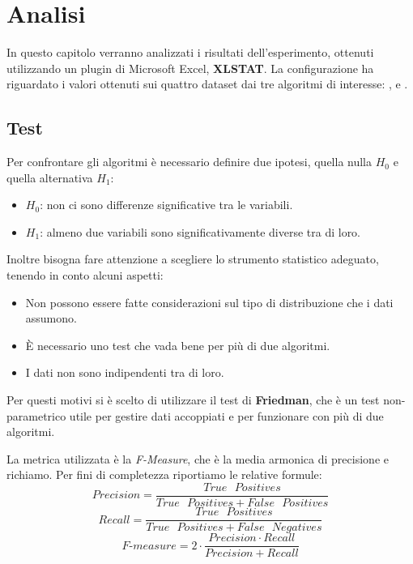 \chapter{Analisi}

In questo capitolo verranno analizzati i risultati dell'esperimento, ottenuti utilizzando un plugin di Microsoft Excel, \textbf{XLSTAT}. La configurazione ha riguardato i valori ottenuti sui quattro dataset dai tre algoritmi di interesse: ,  e .

\section{Test}

Per confrontare gli algoritmi è necessario definire due ipotesi, quella nulla $H_0$ e quella alternativa $H_1$:

\begin{itemize}
	\item $H_0$: non ci sono differenze significative tra le variabili.
	\item $H_1$: almeno due variabili sono significativamente diverse tra di loro.
\end{itemize}

\noindent
Inoltre bisogna fare attenzione a scegliere lo strumento statistico adeguato, tenendo in conto alcuni aspetti:
\begin{itemize}
	\item Non possono essere fatte considerazioni sul tipo di distribuzione che i dati assumono.
	\item È necessario uno test che vada bene per più di due algoritmi.
	\item I dati non sono indipendenti tra di loro.
\end{itemize}

Per questi motivi si è scelto di utilizzare il test di \textbf{Friedman}, che è un test non-parametrico utile per gestire dati accoppiati e per funzionare con più di due algoritmi\cite{Demsar:2006:SCC:1248547.1248548}.

La metrica utilizzata è la \emph{F-Measure}, che è la media armonica di precisione e richiamo. Per fini di completezza riportiamo le relative formule:
$$Precision = \frac{True\mbox{ }Positives}{True\mbox{ }Positives + False\mbox{ }Positives}$$
$$Recall = \frac{True\mbox{ }Positives}{True\mbox{ }Positives + False\mbox{ }Negatives}$$
$$ F\mbox{-}measure = 2 \cdot \frac{Precision \cdot Recall}{Precision + Recall} $$


